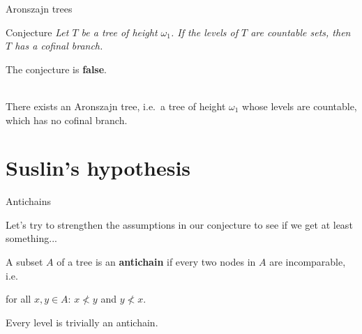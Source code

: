 \documentclass{beamer}
\theoremstyle{num.custom-title}
\theoremstyle{custom-title}
\renewcommand{\emph}[1]{\textbf{#1}}
\begin{document}
\begin{frame}{Aronszajn trees}

\begin{block}{Conjecture}
\textit{Let $T$ be a tree of height $\omega_1$. If the levels of $T$ are countable sets, then $T$ has a cofinal branch.}
\end{block}

\pause

The conjecture is \emph{false}.\\
\ 
\begin{theorem}[Aronszajn, 1934]
There exists an Aronszajn tree, i.e.\ a tree of height $\omega_1$ whose levels are countable, which has no cofinal branch.
\end{theorem}

\end{frame}


\section{Suslin's hypothesis}


\begin{frame}{Antichains}

Let's try to strengthen the assumptions in our conjecture to see if we get at least something...

\begin{definition}
A subset $A$ of a tree is an \emph{antichain} if every two nodes in $A$ are incomparable, i.e. 
\begin{center}
for all $x,y \in A$: \quad $x \nless y$ and $y \nless x$.
\end{center}
\end{definition}

Every level is trivially an antichain.

\end{frame}
\end{document}
